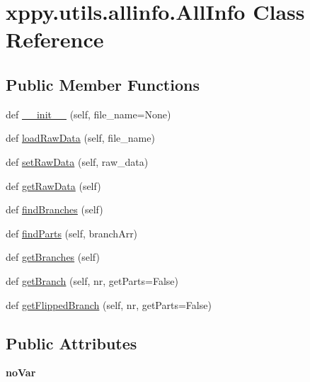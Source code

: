 \hypertarget{classxppy_1_1utils_1_1allinfo_1_1_all_info}{}\section{xppy.\+utils.\+allinfo.\+All\+Info Class Reference}
\label{classxppy_1_1utils_1_1allinfo_1_1_all_info}
\subsection*{Public Member Functions}
\begin{DoxyCompactItemize}
\item 
def \mbox{\hyperlink{classxppy_1_1utils_1_1allinfo_1_1_all_info_a3ad3f88c2830799d374025b242d4fb46}{\+\_\+\+\_\+init\+\_\+\+\_\+}} (self, file\+\_\+name=None)
\item 
def \mbox{\hyperlink{classxppy_1_1utils_1_1allinfo_1_1_all_info_a8d7628fd3cb953454ed1ab71bcac0a97}{load\+Raw\+Data}} (self, file\+\_\+name)
\item 
def \mbox{\hyperlink{classxppy_1_1utils_1_1allinfo_1_1_all_info_accfdfbcb84c9f5f743d989dd1f442137}{set\+Raw\+Data}} (self, raw\+\_\+data)
\item 
def \mbox{\hyperlink{classxppy_1_1utils_1_1allinfo_1_1_all_info_a8693390124c020276177f1de6a88ad65}{get\+Raw\+Data}} (self)
\item 
def \mbox{\hyperlink{classxppy_1_1utils_1_1allinfo_1_1_all_info_a559bd122809100e42948ac0b67f2e977}{find\+Branches}} (self)
\item 
def \mbox{\hyperlink{classxppy_1_1utils_1_1allinfo_1_1_all_info_a3877bdec8a52cbd84a94e692902be227}{find\+Parts}} (self, branch\+Arr)
\item 
def \mbox{\hyperlink{classxppy_1_1utils_1_1allinfo_1_1_all_info_a18fd1315ff2c4d132ded1a735dd643b4}{get\+Branches}} (self)
\item 
def \mbox{\hyperlink{classxppy_1_1utils_1_1allinfo_1_1_all_info_a463169e8aff4314f702a5d6fb84a3fa6}{get\+Branch}} (self, nr, get\+Parts=False)
\item 
def \mbox{\hyperlink{classxppy_1_1utils_1_1allinfo_1_1_all_info_aef590728eed661ea966a515e778230dc}{get\+Flipped\+Branch}} (self, nr, get\+Parts=False)
\end{DoxyCompactItemize}
\subsection*{Public Attributes}
\begin{DoxyCompactItemize}
\item 
\mbox{\label{classxppy_1_1utils_1_1allinfo_1_1_all_info_a585556d53b408605004bd04d81f6739e}} 
{\bfseries no\+Var}
\end{DoxyCompactItemize}


